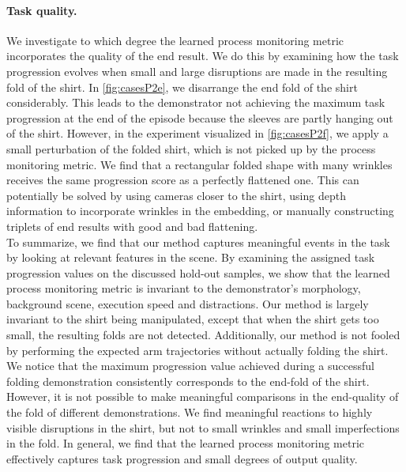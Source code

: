 \documentclass[\home/main.tex]{subfiles}
\begin{document}
\paragraph{Task quality.}
We investigate to which degree the learned process monitoring metric incorporates the quality of the end result. We do this by examining how the task progression evolves when small and large disruptions are made in the resulting fold of the shirt. In \cref{fig:casesP2e}, we disarrange the end fold of the shirt considerably. This leads to the demonstrator not achieving the maximum task progression at the end of the episode because the sleeves are partly hanging out of the shirt. However, in the experiment visualized in \cref{fig:casesP2f}, we apply a small perturbation of the folded shirt, which is not picked up by the process monitoring metric. We find that a rectangular folded shape with many wrinkles receives the same progression score as a perfectly flattened one. This can potentially be solved by using cameras closer to the shirt, using depth information to incorporate wrinkles in the embedding, or manually constructing triplets of end results with good and bad flattening. \\

To summarize, we find that our method captures meaningful events in the task by looking at relevant features in the scene. By examining the assigned task progression values on the discussed hold-out samples, we show that the learned process monitoring metric is invariant to the demonstrator's morphology, background scene, execution speed and distractions. Our method is largely invariant to the shirt being manipulated, except that when the shirt gets too small, the resulting folds are not detected. Additionally, our method is not fooled by performing the expected arm trajectories without actually folding the shirt. We notice that the maximum progression value achieved during a successful folding demonstration consistently corresponds to the end-fold of the shirt. However, it is not possible to make meaningful comparisons in the end-quality of the fold of different demonstrations. We find meaningful reactions to highly visible disruptions in the shirt, but not to small wrinkles and small imperfections in the fold. In general, we find that the learned process monitoring metric effectively captures task progression and small degrees of output quality.
\end{document}
